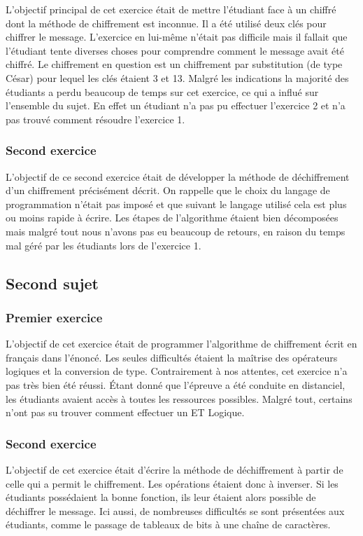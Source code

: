\documentclass[12pt]{article}
\begin{document}

L'objectif principal de cet exercice était de mettre l'étudiant face à un chiffré dont la méthode de chiffrement est inconnue. Il a été utilisé deux clés pour chiffrer le message. L'exercice en lui-même n'était pas difficile mais il fallait que l'étudiant tente diverses choses pour comprendre comment le message avait été chiffré. Le chiffrement en question est un chiffrement par substitution (de type César) pour lequel les clés étaient \textsf{3} et \textsf{13}. Malgré les indications la majorité des étudiants a perdu beaucoup de temps sur cet exercice, ce qui a influé sur l'ensemble du sujet. En effet un étudiant n'a pas pu effectuer l'exercice 2 et n'a pas trouvé comment résoudre l'exercice 1.


\subsubsection{Second exercice}

L'objectif de ce second exercice était de développer la méthode de déchiffrement d'un chiffrement précisément décrit. On rappelle que le choix du langage de programmation n'était pas imposé et que suivant le langage utilisé cela est plus ou moins rapide à écrire. Les étapes de l'algorithme étaient bien décomposées mais malgré tout nous n'avons pas eu beaucoup de retours, en raison du temps mal géré par les étudiants lors de l'exercice 1.

\pagebreak

\subsection{Second sujet}
\subsubsection{Premier exercice}
L'objectif de cet exercice était de programmer l'algorithme de chiffrement écrit en français dans l'énoncé. Les seules difficultés étaient la maîtrise des opérateurs logiques et la conversion de type. Contrairement à nos attentes, cet exercice n'a pas très bien été réussi. Étant donné que l'épreuve a été conduite en distanciel, les étudiants avaient accès à toutes les ressources possibles. Malgré tout, certains n'ont pas su trouver comment effectuer un \textsf{ET Logique}.

\subsubsection{Second exercice}
L'objectif de cet exercice était d'écrire la méthode de déchiffrement à partir de celle qui a permit le chiffrement. Les opérations étaient donc à inverser. Si les étudiants possédaient la bonne fonction, ils leur étaient alors possible de déchiffrer le message. Ici aussi, de nombreuses difficultés se sont présentées aux étudiants, comme le passage de tableaux de bits à une chaîne de caractères.
\end{document}
